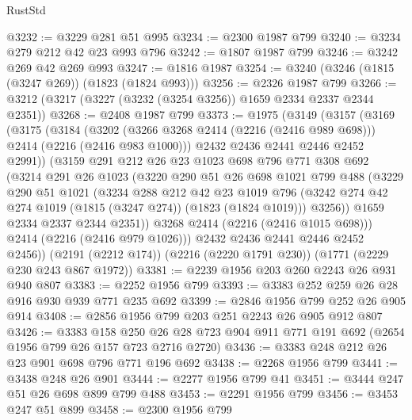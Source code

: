 \begin{lexlean}{RustStd}
\begin{coremodule}
@3232 := @3229 @281 @51 @995
@3234 := @2300 @1987 @799
@3240 := @3234 @279 @212 @42 @23 @993 @796
@3242 := @1807 @1987 @799
@3246 := @3242 @269 @42 @269 @993
@3247 := @1816 @1987
@3254 := @3240 (@3246 (@1815 (@3247 @269)) (@1823 (@1824 @993)))
@3256 := @2326 @1987 @799
@3266 := @3212 (@3217 (@3227 (@3232 (@3254 @3256)) @1659 @2334 @2337 @2344 @2351))
@3268 := @2408 @1987 @799
@3373 := @1975
    (@3149
      (@3157
        (@3169
          (@3175
            (@3184
              (@3202 (@3266 @3268 @2414 (@2216 (@2416 @989 @698))) @2414 (@2216 (@2416 @983 @1000)))
              @2432
              @2436
              @2441
              @2446
              @2452
              @2991))
          (@3159
            @291
            @212
            @26
            @23
            @1023
            @698
            @796
            @771
            @308
            @692
            (@3214
              @291
              @26
              @1023
              (@3220
                @290
                @51
                @26
                @698
                @1021
                @799
                @488
                (@3229
                  @290
                  @51
                  @1021
                  (@3234
                    @288
                    @212
                    @42
                    @23
                    @1019
                    @796
                    (@3242 @274 @42 @274 @1019 (@1815 (@3247 @274)) (@1823 (@1824 @1019)))
                    @3256))
                @1659
                @2334
                @2337
                @2344
                @2351))
            @3268
            @2414
            (@2216 (@2416 @1015 @698)))
          @2414
          (@2216 (@2416 @979 @1026)))
        @2432
        @2436
        @2441
        @2446
        @2452
        @2456))
    (@2191 (@2212 @174))
    (@2216 (@2220 @1791 @230))
    (@1771 (@2229 @230 @243 @867 @1972))
@3381 := @2239 @1956 @203 @260 @2243 @26 @931 @940 @807
@3383 := @2252 @1956 @799
@3393 := @3383 @252 @259 @26 @28 @916 @930 @939 @771 @235 @692
@3399 := @2846 @1956 @799 @252 @26 @905 @914
@3408 := @2856 @1956 @799 @203 @251 @2243 @26 @905 @912 @807
@3426 := @3383
    @158
    @250
    @26
    @28
    @723
    @904
    @911
    @771
    @191
    @692
    (@2654 @1956 @799 @26 @157 @723 @2716 @2720)
@3436 := @3383 @248 @212 @26 @23 @901 @698 @796 @771 @196 @692
@3438 := @2268 @1956 @799
@3441 := @3438 @248 @26 @901
@3444 := @2277 @1956 @799 @41
@3451 := @3444 @247 @51 @26 @698 @899 @799 @488
@3453 := @2291 @1956 @799
@3456 := @3453 @247 @51 @899
@3458 := @2300 @1956 @799

\end{coremodule}
\end{lexlean}
